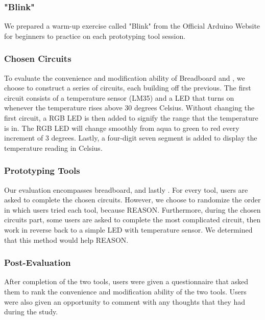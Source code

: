\subsubsection{"Blink"}

We prepared a warm-up exercise called "Blink" from the Official Arduino Website for beginners to practice on each prototyping tool session.

\subsubsection{Chosen Circuits}
To evaluate the convenience and modification ability of Breadboard and \papertitle, we choose to construct a series of circuits, each building off the previous. The first circuit consists of a temperature sensor (LM35) and a LED that turns on whenever the temperature rises above 30 degrees Celsius. Without changing the first circuit, a RGB LED is then added to signify the range that the temperature is in. The RGB LED will change smoothly from aqua to green to red every increment of 3 degrees. Lastly, a four-digit seven segment is added to display the temperature reading in Celsius.

\subsubsection{Prototyping Tools}
Our evaluation encompasses breadboard, and lastly \papertitle. For every tool, users are asked to complete the chosen circuits. However, we choose to randomize the order in which users tried each tool, because REASON. Furthermore, during the chosen circuits part, some users are asked to complete the most complicated circuit, then work in reverse back to a simple LED with temperature sensor. We determined that this method would help REASON. 

\subsubsection{Post-Evaluation}
After completion of the two tools, users were given a questionnaire that asked them to rank the convenience and modification ability of the two tools. Users were also given an opportunity to comment with any thoughts that they had during the study.
